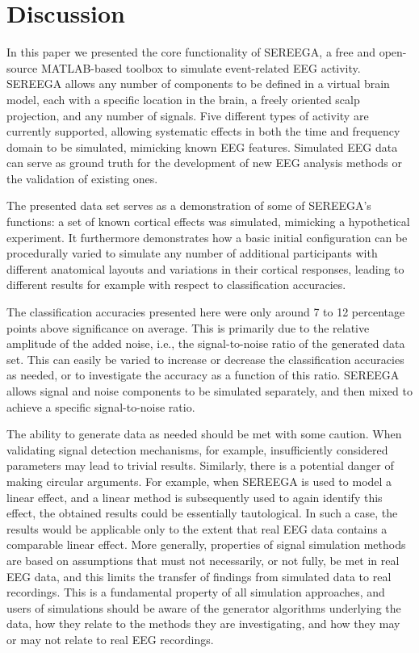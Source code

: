 \section{Discussion}

In this paper we presented the core functionality of SEREEGA, a free and open-source MATLAB-based toolbox to simulate event-related EEG activity. SEREEGA allows any number of components to be defined in a virtual brain model, each with a specific location in the brain, a freely oriented scalp projection, and any number of signals. Five different types of activity are currently supported, allowing systematic effects in both the time and frequency domain to be simulated, mimicking known EEG features. Simulated EEG data can serve as ground truth for the development of new EEG analysis methods or the validation of existing ones.

The presented data set serves as a demonstration of some of SEREEGA's functions: a set of known cortical effects was simulated, mimicking a hypothetical experiment. It furthermore demonstrates how a basic initial configuration can be procedurally varied to simulate any number of additional participants with different anatomical layouts and variations in their cortical responses, leading to different results for example with respect to classification accuracies. 

The classification accuracies presented here were only around 7 to 12 percentage points above significance on average. This is primarily due to the relative amplitude of the added noise, i.e., the signal-to-noise ratio of the generated data set. This can easily be varied to increase or decrease the classification accuracies as needed, or to investigate the accuracy as a function of this ratio. SEREEGA allows signal and noise components to be simulated separately, and then mixed to achieve a specific signal-to-noise ratio.

The ability to generate data as needed should be met with some caution. When validating signal detection mechanisms, for example, insufficiently considered parameters may lead to trivial results. Similarly, there is a potential danger of making circular arguments. For example, when SEREEGA is used to model a linear effect, and a linear method is subsequently used to again identify this effect, the obtained results could be essentially tautological. In such a case, the results would be applicable only to the extent that real EEG data contains a comparable linear effect. More generally, properties of signal simulation methods are based on assumptions that must not necessarily, or not fully, be met in real EEG data, and this limits the transfer of findings from simulated data to real recordings. This is a fundamental property of all simulation approaches, and users of simulations should be aware of the generator algorithms underlying the data, how they relate to the methods they are investigating, and how they may or may not relate to real EEG recordings.

